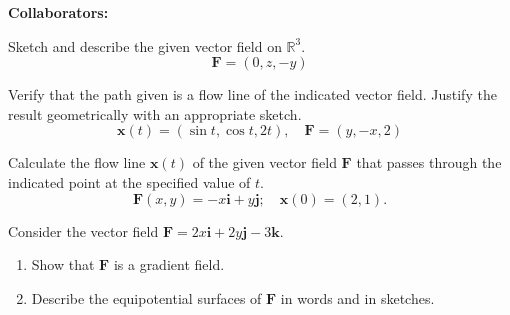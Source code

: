 \documentclass[11pt,letterpaper,boxed]{hmcpset}
\newcommand{\R}{\mathbb{R}}
\begin{document}
\noindent\textbf{Collaborators:} 


\begin{problem}[Colley 3.3 \#9]
Sketch and describe the given vector field on $\R^3$.
\[
	\mathbf{F} = (0,z,-y)
\]
\end{problem}

\begin{solution}
\vfill
\end{solution}
\newpage

\begin{problem}[Colley 3.3 \#18]
Verify that the path given is a flow line of the indicated vector field. Justify the result geometrically with an appropriate sketch.
\[
	\mathbf{x}(t) = (\sin{t},\cos{t},2t), \quad \mathbf{F} = (y,-x,2)
\]
\end{problem}

\begin{solution}
\vfill
\end{solution}
\newpage

\begin{problem}[Colley 3.3 \#20]
Calculate the flow line $\mathbf{x}(t)$ of the given vector field $\mathbf{F}$ that passes through the indicated point at 
the specified value of $t$.
\[
	\mathbf{F}(x,y) = -x\mathbf{i}+y\mathbf{j}; \quad \mathbf{x}(0)=(2,1).
\]
\end{problem}

\begin{solution}
\vfill
\end{solution}
\newpage

\begin{problem}[Colley 3.3 \#24]
Consider the vector field $\mathbf{F} = 2x\mathbf{i}+2y\mathbf{j}-3\mathbf{k}$.
\begin{enumerate}
\item Show that $\mathbf{F}$ is a gradient field.
\item Describe the equipotential surfaces of $\mathbf{F}$ in words and in sketches.
\end{enumerate}
\end{problem}

\begin{solution}
\vfill
\end{solution}
\end{document}
